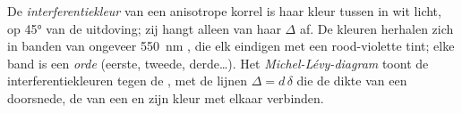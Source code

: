 \begin{definition}\label{def:b1:optical-mineralogy:interference-colour}
De \emph{interferentiekleur} van een anisotrope korrel is haar kleur tussen  in wit licht, op \ang{45} van de
uitdoving; zij hangt alleen van haar  $\Delta$ af. De kleuren herhalen zich in banden van ongeveer \qty{550}{nm} , die elk eindigen met een
rood-violette tint; elke band is een \emph{orde} (eerste, tweede, derde\dots). Het \emph{Michel-Lévy-diagram}
toont de interferentiekleuren tegen de , met de lijnen $\Delta = d\,\delta$ die de dikte van een doorsnede, de  van een  en
zijn kleur met elkaar verbinden.
\end{definition}

